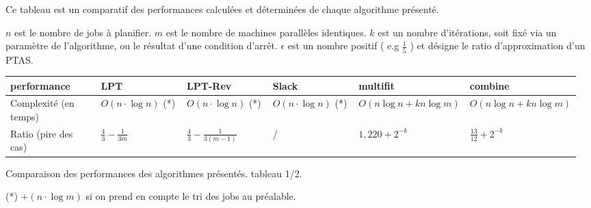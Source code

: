 \documentclass[a4paper,12pt]{report}
\theoremstyle{plain}				%
\theoremstyle{definition}				%
\begin{document}

Ce tableau est un comparatif des performances calculées et déterminées de chaque algorithme présenté. 

$n$ est le nombre de jobs à planifier.
$m$ est le nombre de machines parallèles identiques.
$k$ est un nombre d'itérations, soit  fixé via un paramètre de l'algorithme, ou le résultat d'une condition d'arrêt.
$\epsilon$ est un nombre positif ( e.g $\frac{1}{5}$ ) et désigne le ratio d'approximation d'un PTAS.

\begin{center}
\begin{tabular}{p{0.17\linewidth}
				p{0.16\linewidth}
				p{0.16\linewidth}
				p{0.16\linewidth}
				p{0.16\linewidth}
				p{0.16\linewidth}}

\hline
performance 						& 	
							LPT 	& 
							LPT-Rev &
							Slack 	&
							multifit& 
							combine  
\\ \hline

Complexité \newline (en temps) 		& 
							$O(n \cdot \log n) $ (*) &		%
							$O(n \cdot \log n)$  (*) & 			%
							$O(n \cdot \log n)$  (*) & 			%
							$O(n \log n + kn \log m)$& 		%
							$O(n \log n + kn \log m)$		%
													 
\\	\hline
Ratio \newline (pire des cas)		& 
							$\frac{4}{3} - \frac{1}{3m}$&		%
							$\frac{4}{3} - \frac{1}{3(m-1)}$&	%
							/&								%
							$1,220 + 2^{-k}$& 					%
							$\frac{13}{12} + 2^{-k}$			%
\\
\hline
\end{tabular}
Comparaison des performances des algorithmes présentés. tableau 1/2.

(*) $+ (n \cdot \log m)$ si on prend en compte le tri des jobs au préalable.
\end{center}
\end{document}
